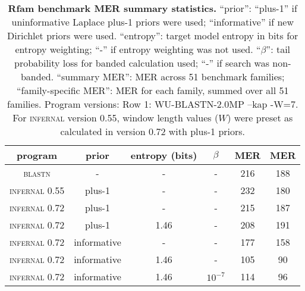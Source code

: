 \begin{table}[htb]
\begin{center}
\begin{tabular}{cccccc}
\multicolumn{1}{c}{program} &
\multicolumn{1}{c}{prior} & \multicolumn{1}{c}{entropy (bits)} &
\multicolumn{1}{c}{$\beta$} & \multicolumn{1}{c}{MER} &
\multicolumn{1}{c}{MER} \\ \hline
\textsc{blastn}         & -           & -    & -         & 216 & 188 \\
\textsc{infernal} 0.55  & plus-1      & -    & -         & 232 & 180 \\
\textsc{infernal} 0.72  & plus-1      & -    & -         & 215 & 187 \\ 
\textsc{infernal} 0.72  & plus-1      & 1.46 & -         & 208 & 191 \\ 
\textsc{infernal} 0.72  & informative & -    & -         & 177 & 158 \\ 
\textsc{infernal} 0.72  & informative & 1.46 & -         & 105 &  90 \\ 
\textsc{infernal} 0.72  & informative & 1.46 & $10^{-7}$ & 114 &  96 \\ 
\end{tabular}
\end{center}
\caption{\textbf{Rfam benchmark MER summary statistics.} 
    ``prior'': ``plus-1'' if uninformative Laplace plus-1 priors were
    used; ``informative'' if new Dirichlet priors were used.
    ``entropy'': target model entropy in bits for entropy weighting; ``-''
    if entropy weighting was not used.
    ``$\beta$'': tail probability loss for banded calculation used; ``-'' if search
    was non-banded. ``summary MER'': MER across 51 benchmark
    families; ``family-specific MER'': MER for each family, summed
    over all 51 families. Program versions: Row 1: WU-BLASTN-2.0MP
    --kap -W=7. For \textsc{infernal} version 0.55, window length values ($W$)
    were preset as calculated in version 0.72 with plus-1 priors.}
\label{tbl:rmarkmerlist}
\end{table}

